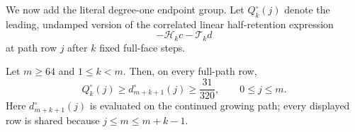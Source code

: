 We now add the literal degree-one endpoint group.  Let $Q_k^\circ(j)$ denote
the leading, undamped version of the correlated linear half-retention
expression
\begin{equation}
 -\mathcal H_kc-\mathcal T_kd
 \label{eq:terminal-modal-stopped-leading-Q}
\end{equation}
at path row $j$ after $k$ fixed full-face steps.

\begin{lemma}
\label{lem:terminal-modal-stopped-leading-baseline}
Let $m\ge64$ and $1\le k<m$.  Then, on every full-path row,
\begin{equation}
 Q_k^\circ(j)\ge d_{m+k+1}^\circ(j)\ge\frac{31}{320},
 \qquad0\le j\le m.
 \label{eq:terminal-modal-stopped-leading-baseline}
\end{equation}
Here $d_{m+k+1}^\circ(j)$ is evaluated on the continued growing path; every
displayed row is shared because $j\le m\le m+k-1$.
\end{lemma}

